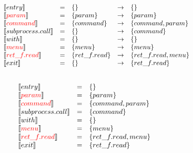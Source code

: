 \begin{frame}
  \[
\begin{array}{lclcl}
  \constraint{entry} & = &  \{\} & \rightarrow & \{\}\\
  \assignconstraint{param} & = & \{param\}& \rightarrow & \{param\}\\ 
  \assignconstraint{command} & = &\{command\}& \rightarrow & \{command, param\}\\
  \constraint{subprocess.call} & = & \{\}& \rightarrow & \{command\}\\
  \constraint{with} & = & \{\}& \rightarrow & \{\}\\
  \assignconstraint{menu} & = &  \{menu \}& \rightarrow & \{menu\} \\
  \assignconstraint{ret\_f.read} & = & \{ret\_f.read\}& \rightarrow & \{ret\_f.read, menu\}\\
  \constraint{exit} & = & \{\}& \rightarrow & \{ret\_f.read\}\\
  && && \phantom{\{command, param\}\{command, param\}}
\end{array}
\]
\end{frame}


\begin{frame}
  \[
\begin{array}{lclcl}
  \constraint{entry} & = & \{\}& \phantom{\rightarrow} & \phantom{\{command, param\}} \\
  \assignconstraint{param} & = & \{param\}& \\ 
  \assignconstraint{command} & = & \{command, param\}& \\
  \constraint{subprocess.call} & = & \{command\}& \\
  \constraint{with} & = & \{\}& \\
  \assignconstraint{menu} & = & \{menu\} & \\
  \assignconstraint{ret\_f.read} & = & \{ret\_f.read, menu\}& \\
  \constraint{exit} & = & \{ret\_f.read\}& \\
  && \phantom{\{command, param\}} && \phantom{\{command, param\}}
\end{array}
\]
\end{frame}


